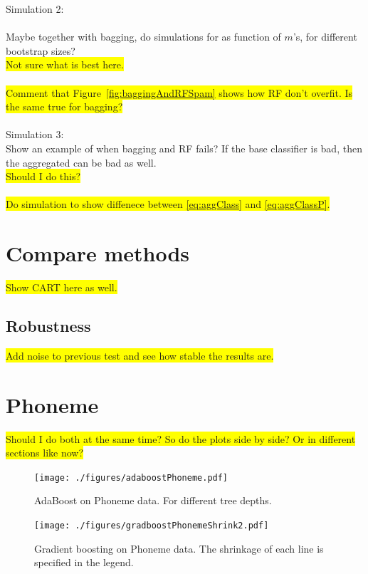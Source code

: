 Simulation 2: \\
\\
Maybe together with bagging, do simulations for as function of $m$'s, for different bootstrap sizes? \\
\colorbox{yellow}{Not sure what is best here.}\\
\\
\colorbox{yellow}{Comment that Figure~\ref{fig:baggingAndRFSpam} shows how RF don't overfit. Is the same true for bagging?}\\
\\
Simulation 3: \\
Show an example of when bagging and RF fails? If the base classifier is bad, then the aggregated can be bad as well.\\
\colorbox{yellow}{Should I do this?}\\
\\
\colorbox{yellow}{Do simulation to show diffenece between \eqref{eq:aggClass} and \eqref{eq:aggClassP}.}








\section{Compare methods}
\label{sec:Compare methods}
\colorbox{yellow}{Show CART here as well.}

\subsection{Robustness}
\label{sub:Robustness}

\colorbox{yellow}{Add noise to previous test and see how stable the results are.}
\section{Phoneme}
\label{sec:Phoneme}
\colorbox{yellow}{Should I do both at the same time? So do the plots side by side? Or in different sections like now?}

\begin{figure}[h!]
\begin{center}
    \texttt{[image: ./figures/adaboostPhoneme.pdf]}
\end{center}
\caption{AdaBoost on Phoneme data. For different tree depths.}
\label{fig:adaboostPhoneme}
\end{figure}

\begin{figure}[h!]
\begin{center}
    \texttt{[image: ./figures/gradboostPhonemeShrink2.pdf]}
\end{center}
\caption{Gradient boosting on Phoneme data. The shrinkage of each line is specified in the legend.}
\label{fig:gradboostPhonemeShrink2}
\end{figure}

